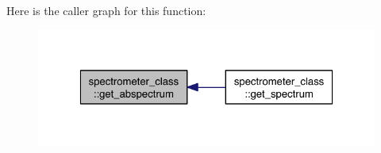 Here is the caller graph for this function\+:\nopagebreak
\begin{figure}[H]
\begin{center}
\leavevmode
\includegraphics[width=324pt]{namespacespectrometer__class_ad2c4936524c8702e1c4e53a54a043f31_icgraph}
\end{center}
\end{figure}
\mbox{\label{namespacespectrometer__class_a068171434fa75613677e6357291df1fe}} 
